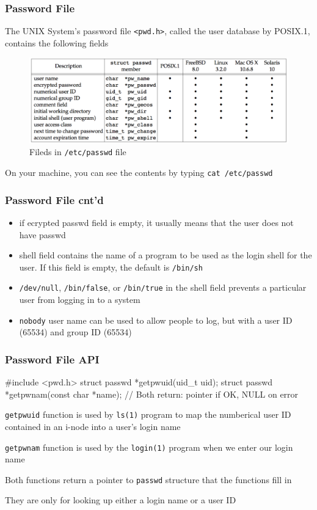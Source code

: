 \documentclass[newPxFont,sthlmFooter,nooffset]{beamer}
\begin{document}
\begin{frame}[containsverbatim,t]
  \frametitle{Password File}

The UNIX System’s password file \texttt{<pwd.h>}, called the user database by POSIX.1, contains the following fields

\begin{figure}[h]
  \centering
  \includegraphics[width=\textwidth]{figure/fig6-1_etc_passwd.png}
  \caption{Fileds in \texttt{/etc/passwd} file}
\end{figure}


On your machine, you can see the contents by typing \texttt{cat /etc/passwd}



\end{frame}




\begin{frame}[t]
  \frametitle{Password File cnt'd}
  \begin{itemize}
  \item if ecrypted passwd field is empty, it usually means that the user does not have passwd
  \item shell field contains the name of a program to be used as the login shell for the user. If this field is empty, the default is \texttt{/bin/sh}
  \item \texttt{/dev/null}, \texttt{/bin/false}, or \texttt{/bin/true} in the shell field prevents a particular user from logging in to a system
  \item \texttt{nobody} user name can be used to allow people to log, but with a user ID (65534) and group ID (65534)
  \end{itemize}
\end{frame}

\begin{frame}[containsverbatim,t]
  \frametitle{Password File API }
\begin{codedef}
#include <pwd.h>
struct passwd *getpwuid(uid_t uid);
struct passwd *getpwnam(const char *name);
// Both return: pointer if OK, NULL on error  
\end{codedef}

\texttt{getpwuid} function is used by \texttt{ls(1)} program to map the numberical user ID contained in an i-node into a user's login name

\texttt{getpwnam} function is used by the \texttt{login(1)} program when we enter our login name

Both functions return a pointer to \texttt{passwd} structure that the functions fill in

They are only for looking up either a login name or a user ID
\end{frame}
\end{document}
